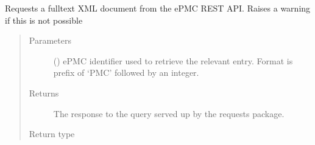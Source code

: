 \documentclass[letterpaper,10pt,english]{sphinxmanual}
\begin{document}
\begin{fulllineitems}
\label{\detokenize{functions:pyresid.request_fulltextXML}}
Requests a fulltext XML document from the ePMC REST API. Raises a warning if this is not
possible
\begin{quote}\begin{description}
\item[{Parameters}] \leavevmode
{} () \textendash{} ePMC identifier used to retrieve the relevant entry. Format is prefix of ‘PMC’
followed by an integer.

\item[{Returns}] \leavevmode
{} \textendash{} The response to the query served up by the requests package.

\item[{Return type}] \leavevmode
{}

\end{description}\end{quote}

\end{fulllineitems}

\end{document}
